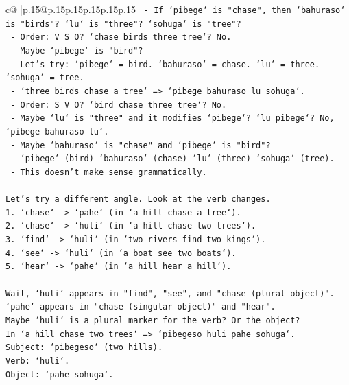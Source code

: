 \documentclass{article}
\begin{document}
{\begin{supertabular}{c@{$\;$}|p{.15\linewidth}@{}p{.15\linewidth}p{.15\linewidth}p{.15\linewidth}p{.15\linewidth}p{.15\linewidth}}
{{{\texttt{       {-} If `pibege` is "chase", then `bahuraso` is "birds"? `lu` is "three"? `sohuga` is "tree"?} \\
\texttt{       {-} Order: V S O? `chase birds three tree`? No.} \\
\texttt{       {-} Maybe `pibege` is "bird"?} \\
\texttt{       {-} Let's try: `pibege` = bird. `bahuraso` = chase. `lu` = three. `sohuga` = tree.} \\
\texttt{       {-} `three birds chase a tree` => `pibege bahuraso lu sohuga`.} \\
\texttt{       {-} Order: S V O? `bird chase three tree`? No.} \\
\texttt{       {-} Maybe `lu` is "three" and it modifies `pibege`? `lu pibege`? No, `pibege bahuraso lu`.} \\
\texttt{       {-} Maybe `bahuraso` is "chase" and `pibege` is "bird"?} \\
\texttt{       {-} `pibege` (bird) `bahuraso` (chase) `lu` (three) `sohuga` (tree).} \\
\texttt{       {-} This doesn't make sense grammatically.} \\
\\ 
\texttt{Let's try a different angle. Look at the verb changes.} \\
\texttt{1. `chase` {-}> `pahe` (in `a hill chase a tree`).} \\
\texttt{2. `chase` {-}> `huli` (in `a hill chase two trees`).} \\
\texttt{3. `find` {-}> `huli` (in `two rivers find two kings`).} \\
\texttt{4. `see` {-}> `huli` (in `a boat see two boats`).} \\
\texttt{5. `hear` {-}> `pahe` (in `a hill hear a hill`).} \\
\\ 
\texttt{Wait, `huli` appears in "find", "see", and "chase (plural object)".} \\
\texttt{`pahe` appears in "chase (singular object)" and "hear".} \\
\texttt{Maybe `huli` is a plural marker for the verb? Or the object?} \\
\texttt{In `a hill chase two trees` => `pibegeso huli pahe sohuga`.} \\
\texttt{Subject: `pibegeso` (two hills).} \\
\texttt{Verb: `huli`.} \\
\texttt{Object: `pahe sohuga`.} \\
}}}
\end{supertabular}}
\end{document}
